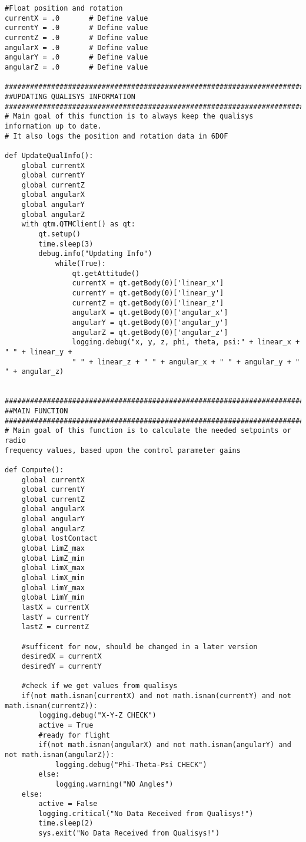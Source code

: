 \begin{lstlisting}
#Float position and rotation
currentX = .0       # Define value
currentY = .0       # Define value
currentZ = .0       # Define value
angularX = .0       # Define value
angularY = .0       # Define value
angularZ = .0       # Define value

##############################################################################
##UPDATING QUALISYS INFORMATION
##############################################################################
# Main goal of this function is to always keep the qualisys information up to date. 
# It also logs the position and rotation data in 6DOF

def UpdateQualInfo():
    global currentX
    global currentY
    global currentZ
    global angularX
    global angularY
    global angularZ
	with qtm.QTMClient() as qt:
	    qt.setup()
	    time.sleep(3)
	    debug.info("Updating Info")
            while(True):
                qt.getAttitude()
                currentX = qt.getBody(0)['linear_x']
                currentY = qt.getBody(0)['linear_y']
                currentZ = qt.getBody(0)['linear_z']
                angularX = qt.getBody(0)['angular_x']
                angularY = qt.getBody(0)['angular_y']
                angularZ = qt.getBody(0)['angular_z']
                logging.debug("x, y, z, phi, theta, psi:" + linear_x + " " + linear_y + 
                " " + linear_z + " " + angular_x + " " + angular_y + " " + angular_z)


##############################################################################
##MAIN FUNCTION
##############################################################################
# Main goal of this function is to calculate the needed setpoints or radio 
frequency values, based upon the control parameter gains

def Compute():
    global currentX
    global currentY
    global currentZ
    global angularX
    global angularY
    global angularZ
    global lostContact
    global LimZ_max 
    global LimZ_min
    global LimX_max
    global LimX_min
    global LimY_max
    global LimY_min
    lastX = currentX
    lastY = currentY
    lastZ = currentZ

    #sufficent for now, should be changed in a later version
    desiredX = currentX
    desiredY = currentY

    #check if we get values from qualisys
    if(not math.isnan(currentX) and not math.isnan(currentY) and not math.isnan(currentZ)): 
        logging.debug("X-Y-Z CHECK")
        active = True
        #ready for flight
        if(not math.isnan(angularX) and not math.isnan(angularY) and not math.isnan(angularZ)):
            logging.debug("Phi-Theta-Psi CHECK")
        else:
            logging.warning("NO Angles")
    else:
        active = False
        logging.critical("No Data Received from Qualisys!")
        time.sleep(2)
        sys.exit("No Data Received from Qualisys!")
 

\end{lstlisting}
